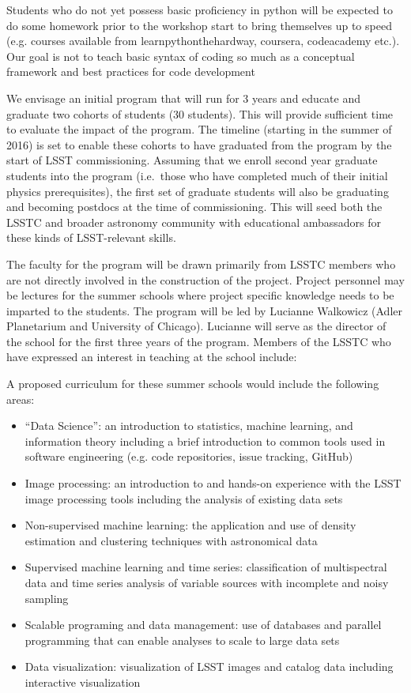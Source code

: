 \documentclass[nofootbib,floatfix,11pt]{article}
\begin{document}
Students who do not yet possess basic proficiency in python will be expected to do some homework prior to the workshop start to bring themselves up to speed (e.g. courses available from learnpythonthehardway, coursera, codeacademy etc.). Our goal is not to teach basic syntax of coding so much as a conceptual framework and best practices for code development


We envisage an initial program that will run for 3 years and educate and graduate two cohorts of students (30 students). This will provide sufficient time to evaluate the impact of the program. The timeline (starting in the summer of  2016) is set to enable these cohorts to have graduated from the program by the start of LSST commissioning. Assuming that we enroll second year graduate students into the program (i.e.\ those who have completed much of their initial physics prerequisites), the first set of graduate students will also be graduating and becoming postdocs at the time of commissioning. This will seed both the LSSTC and broader astronomy community with educational ambassadors for these kinds of LSST-relevant skills.

The faculty for the program will be drawn primarily from LSSTC members who are not directly involved in the construction of the project. Project personnel may be lectures for the summer schools where project specific knowledge needs to be imparted to the students. The program will be led by Lucianne Walkowicz (Adler Planetarium and University of Chicago). Lucianne will serve as the director of the school for the first three years of the program. Members of the LSSTC who have expressed an interest in teaching at the school include:

A proposed curriculum for these summer schools would include the following areas: 

\begin{itemize}
\item “Data Science”: an introduction to statistics, machine learning, and information theory including a brief introduction to common tools used in software engineering (e.g. code repositories, issue tracking, GitHub)
\item Image processing: an introduction to and hands-on experience with the LSST image processing tools including the analysis of existing data sets
\item Non-supervised machine learning: the application and use of density estimation and clustering techniques with astronomical data
\item Supervised machine learning and time series: classification of multispectral data and time series analysis of variable sources with incomplete and noisy sampling
\item Scalable programing and data management: use of databases and parallel programming that can enable analyses to scale to large data sets
\item Data visualization: visualization of LSST images and catalog data including interactive visualization
\end{itemize}
\end{document}
